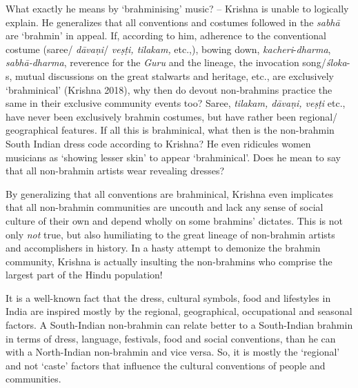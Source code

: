 \vspace{-.1cm}

What exactly he means by ‘brahminising’ music? – Krishna is unable to logically explain. He generalizes that all conventions and costumes followed in the \textit{sabhā} are ‘brahmin’ in appeal. If, according to him, adherence to the conventional costume (saree/ \textit{dāvaṇi}/ \textit{veṣṭi, tilakam,} etc.,), bowing down, \textit{kacheri}-\textit{dharma}, \textit{sabhā-dharma}, reverence for the \textit{Guru} and the lineage, the invocation song/\textit{śloka}-s, mutual discussions on the great stalwarts and heritage, etc., are exclusively ‘brahminical’ (Krishna 2018), why then do devout non-brahmins practice the same in their exclusive community events too? Saree, \textit{tilakam, dāvaṇi, veṣṭi} etc., have never been exclusively brahmin costumes, but have rather been regional/ geographical features. If all this is brahminical, what then is the non-brahmin South Indian dress code according to Krishna? He even ridicules women musicians as ‘showing lesser skin’ to appear ‘brahminical’. Does he mean to say that all non-brahmin artists wear revealing dresses?

By generalizing that all conventions are brahminical, Krishna even implicates that all non-brahmin communities are uncouth and lack any sense of social culture of their own and depend wholly on some brahmins’ dictates. This is not only \textit{not} true, but also humiliating to the great lineage of non-brahmin artists and accomplishers in history. In a hasty attempt to demonize the brahmin community, Krishna is actually insulting the non-brahmins who comprise the largest part of the Hindu population!

It is a well-known fact that the dress, cultural symbols, food and lifestyles in India are inspired mostly by the regional, geographical, occupational and seasonal factors. A South-Indian non-brahmin can relate better to a South-Indian brahmin in terms of dress, language, festivals, food and social conventions, than he can with a North-Indian non-brahmin and vice versa. So, it is mostly the ‘regional’ and not ‘caste’ factors that influence the cultural conventions of people and communities.

